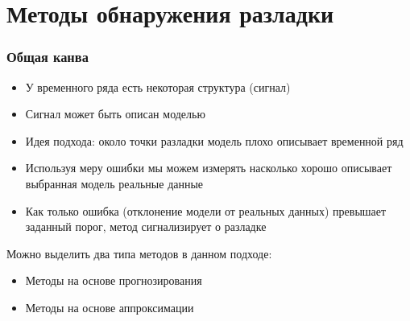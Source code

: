 \documentclass[intlimits, 9pt, unicode]{beamer}
\begin{document}
%
%
%
%
%
%

\section{Методы обнаружения разладки}


\begin{frame}
    \frametitle{Общая канва}

\begin{itemize}
	\item У временного ряда есть некоторая структура (сигнал)
	\item Сигнал может быть описан моделью
	\item Идея подхода: около точки разладки модель плохо описывает
временной ряд
	\item Используя меру ошибки мы можем измерять насколько хорошо описывает выбранная модель реальные данные
	\item Как только ошибка (отклонение
модели от реальных данных) превышает заданный порог, метод сигнализирует о разладке
\end{itemize}


Можно выделить два типа методов в данном подходе:
\begin{itemize}
	\item Методы на основе прогнозирования
	\item Методы на основе аппроксимации
\end{itemize}

\end{frame}
\end{document}
